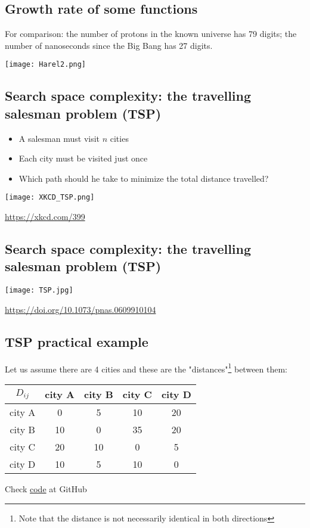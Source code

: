 \subsection{Growth rate of some functions}
 
      For comparison: the number of protons in the known universe has 79 digits; the number of nanoseconds since the Big Bang has 27 digits.\cite{harel_algorithmics_2004}
   
      \begin{center}
        \texttt{[image: Harel2.png]}
      \end{center}
 


\subsection{Search space complexity: the travelling salesman problem (TSP)}
 
      \begin{itemize}
        \item A salesman must visit $n$ cities
        \item Each city must be visited just once
        \item Which path should he take to minimize the total distance travelled?
      \end{itemize}
 
      \begin{center}
        \texttt{[image: XKCD\_TSP.png]}
      \end{center}
      \url{https://xkcd.com/399}
 


\subsection{Search space complexity: the travelling salesman problem (TSP)}
  \begin{center}
    \texttt{[image: TSP.jpg]}
  \end{center}
  \url{https://doi.org/10.1073/pnas.0609910104}


  \subsection{TSP practical example}
  Let us assume there are 4 cities and these are the "distances"\footnote{Note that the distance is not necessarily identical in both directions} between them:
  \begin{center}
  \begin{tabular}{c|cccc}
    $D_{ij}$ & city A & city B & city C & city D \\\hline
    city A & 0 & 5 & 10 & 20  \\
    city B & 10 & 0 & 35 & 20  \\
    city C & 20 & 10 & 0 & 5 \\
    city D & 10 & 5 & 10 & 0
  \end{tabular}
  \end{center}
  Check \href{https://github.com/JordiVillaFreixa/ORcourse/blob/main/code/TSPnaive.ipynb}{code} at GitHub 


